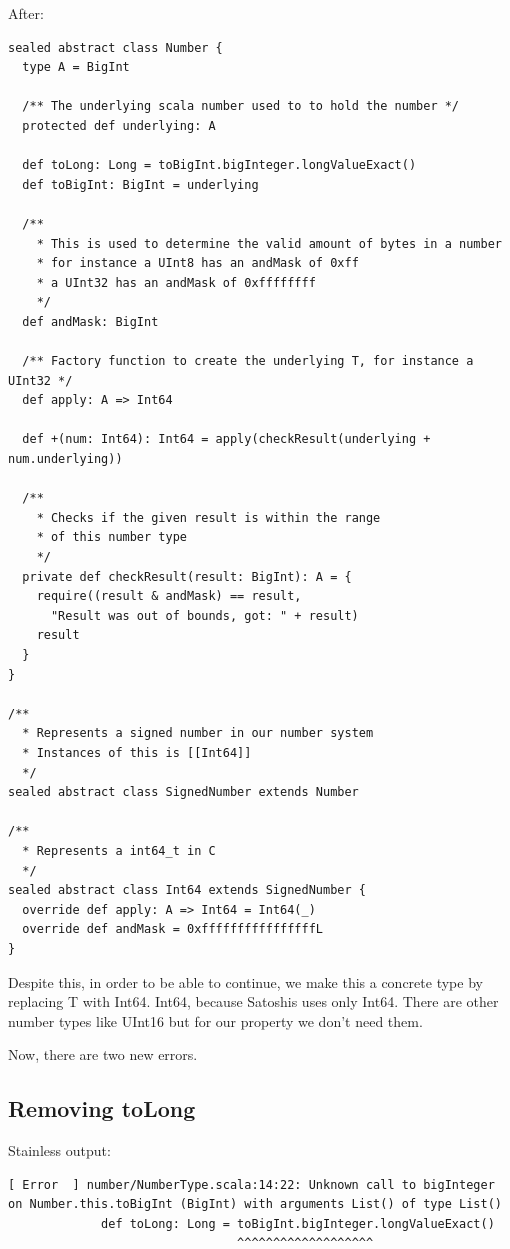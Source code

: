 \documentclass[runningheads]{llncs}
\begin{document}
After:
\begin{lstlisting}[style=scala]
sealed abstract class Number {
  type A = BigInt

  /** The underlying scala number used to to hold the number */
  protected def underlying: A

  def toLong: Long = toBigInt.bigInteger.longValueExact()
  def toBigInt: BigInt = underlying

  /**
    * This is used to determine the valid amount of bytes in a number
    * for instance a UInt8 has an andMask of 0xff
    * a UInt32 has an andMask of 0xffffffff
    */
  def andMask: BigInt

  /** Factory function to create the underlying T, for instance a UInt32 */
  def apply: A => Int64

  def +(num: Int64): Int64 = apply(checkResult(underlying + num.underlying))

  /**
    * Checks if the given result is within the range
    * of this number type
    */
  private def checkResult(result: BigInt): A = {
    require((result & andMask) == result,
      "Result was out of bounds, got: " + result)
    result
  }
}

/**
  * Represents a signed number in our number system
  * Instances of this is [[Int64]]
  */
sealed abstract class SignedNumber extends Number

/**
  * Represents a int64_t in C
  */
sealed abstract class Int64 extends SignedNumber {
  override def apply: A => Int64 = Int64(_)
  override def andMask = 0xffffffffffffffffL
}
\end{lstlisting}

Despite this, in order to be able to continue, we make this a concrete type by replacing T with Int64.
Int64,  because Satoshis uses only Int64.
There are other number types like UInt16 but for our property we don't need them.

Now, there are two new errors.


\subsection{Removing toLong}

Stainless output:
\begin{lstlisting}[style=stainless]
  [ Error  ] number/NumberType.scala:14:22: Unknown call to bigInteger on Number.this.toBigInt (BigInt) with arguments List() of type List()
             def toLong: Long = toBigInt.bigInteger.longValueExact()
                                ^^^^^^^^^^^^^^^^^^^
\end{lstlisting}
\end{document}
